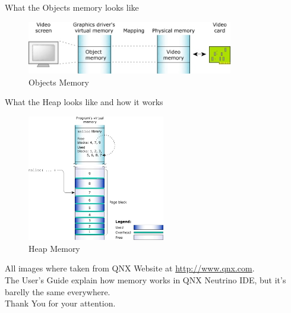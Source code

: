 \documentclass[12pt]{beamer}
\begin{document}
\begin{frame}{What the Objects memory looks like}
	\begin{figure}[h!]
		\centering
		\includegraphics[width=9cm]{6.jpg}
		\caption{Objects Memory}
	\end{figure}
\end{frame}

\begin{frame}{What the Heap looks like and how it works}
	\begin{figure}[h!]
		\centering
		\includegraphics[width=6cm]{7.jpg}
		\caption{Heap Memory}
	\end{figure}
\end{frame}

\begin{frame}
	All images where taken from QNX Website at 
	\url{http://www.qnx.com}. \\
	\vspace{10pt}
	The User's Guide explain how memory works in QNX Neutrino IDE, but it's barelly the same everywhere.\\
	\vspace{10pt}
	Thank You for your attention.
\end{frame}
\end{document}
